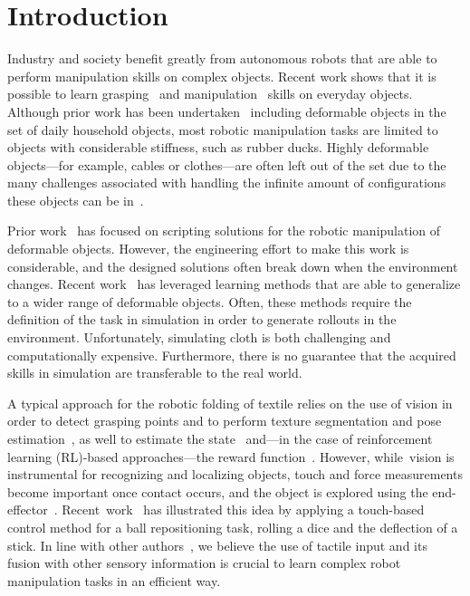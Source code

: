 \documentclass[applsci,article,accept,moreauthors,pdftex]{Definitions/mdpi}
\begin{document}
\section{Introduction}
Industry and society benefit greatly from autonomous robots that are able to perform manipulation skills on complex objects. Recent work shows that it is possible to learn grasping~\cite{Levine2018, Morrison2018} and manipulation~\cite{Agrawal2016, Gu2017} skills on everyday objects. Although prior work has been undertaken~\cite{Levine2018} including deformable objects in the set of daily household objects, most robotic manipulation tasks are limited to objects with considerable stiffness, such as rubber ducks. Highly deformable objects---for example, cables or clothes---are often left out of the set due to the many challenges associated with handling the infinite amount of configurations these objects can be in~\cite{Foresti2004}.

Prior work~\cite{Saha2007, Maitin2010, Doumanoglou2016} has focused on scripting solutions for the robotic manipulation of deformable objects. However, the engineering effort to make this work is considerable, and the designed solutions often break down when the environment changes. Recent work~\cite{Matas2018, Seita2018} has leveraged learning methods that are able to generalize to a wider range of deformable objects. Often, these methods require the definition of the task in simulation in order to generate rollouts in the environment. Unfortunately, simulating cloth is both challenging and computationally expensive. Furthermore, there is no guarantee that the acquired skills in simulation are transferable to the real world. \par

A typical approach for the robotic folding of textile relies on the use of vision in order to detect grasping points and to perform texture segmentation and pose estimation~\cite{Maitin2010, Doumanoglou2016, Bersch2011}, as well to estimate the state~\cite{Matas2018} and---in the case of reinforcement learning (RL)-based approaches---the reward function~\cite{Tsurumine2019}. However, while~vision is instrumental for recognizing and localizing objects, touch and force measurements become important once contact occurs, and the object is explored using the end-effector~\cite{Billard2019}. Recent~work~\cite{Tian2019} has illustrated this idea by applying a touch-based control method for a ball repositioning task, rolling a dice and the deflection of a stick. In line with other authors~\cite{Tian2019, Lee2019}, we believe the use of tactile input and its fusion with other sensory information is crucial to learn complex robot manipulation tasks in an efficient way. \par
\end{document}

